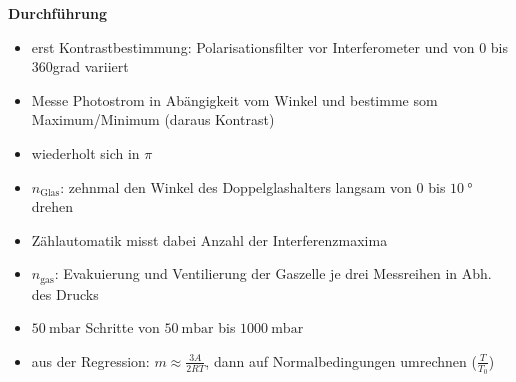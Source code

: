 \textbf{Durchführung}
\begin{itemize}
    \item erst Kontrastbestimmung: Polarisationsfilter vor Interferometer und von 0 bis 360grad variiert
    \item Messe Photostrom in Abängigkeit vom Winkel und bestimme som Maximum/Minimum (daraus Kontrast)
    \item wiederholt sich in $\pi$
    \item $n_\text{Glas}$: zehnmal den Winkel des Doppelglashalters langsam von 0 bis $\SI{10}{\degree}$ drehen
    \item Zählautomatik misst dabei Anzahl der Interferenzmaxima
    \item $n_\text{gas}$: Evakuierung und Ventilierung der Gaszelle je drei Messreihen in Abh. des Drucks
    \item $\SI{50}{\milli\bar}$ Schritte von $\SI{50}{\milli\bar}$ bis $\SI{1000}{\milli\bar}$
    \item aus der Regression: $m\approx\frac{3A}{2RT}$, dann auf Normalbedingungen umrechnen ($\frac{T}{T_0}$)
\end{itemize}
